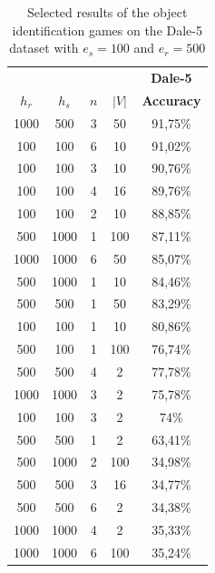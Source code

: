 \begin{table}[ht]
    \centering
    \begin{tabular}{cccc|c}
        \toprule
               &        &     &       & \multicolumn{1}{c}{\textbf{Dale-5}} \\  \cmidrule(lr){5-5}
        $h_r$  & $h_s$  & $n$ & $|V|$ & \textbf{Accuracy}                   \\\midrule
        {1000} & {500}  & {3} & {50}  & {91,75\%}                           \\
        {100}  & {100}  & {6} & {10}  & {91,02\%}                           \\
        {100}  & {100}  & {3} & {10}  & {90,76\%}                           \\
        {100}  & {100}  & {4} & {16}  & {89,76\%}                           \\
        {100}  & {100}  & {2} & {10}  & {88,85\%}                           \\
        {500}  & {1000} & {1} & {100} & {87,11\%}                           \\
        {1000} & {1000} & {6} & {50}  & {85,07\%}                           \\
        {500}  & {1000} & {1} & {10}  & {84,46\%}                           \\
        {500}  & {500}  & {1} & {50}  & {83,29\%}                           \\
        {100}  & {100}  & {1} & {10}  & {80,86\%}                           \\
        {500}  & {100}  & {1} & {100} & {76,74\%}                           \\
        {500}  & {500}  & {4} & {2}   & {77,78\%}                           \\
        {1000} & {1000} & {3} & {2}   & {75,78\%}                           \\
        {100}  & {100}  & {3} & {2}   & {74\%}                              \\
        {500}  & {500}  & {1} & {2}   & {63,41\%}                           \\
        {500}  & {1000} & {2} & {100} & {34,98\%}                           \\
        {500}  & {500}  & {3} & {16}  & {34,77\%}                           \\
        {500}  & {500}  & {6} & {2}   & {34,38\%}                           \\
        {1000} & {1000} & {4} & {2}   & {35,33\%}                           \\
        {1000} & {1000} & {6} & {100} & {35,24\%}                           \\
        \bottomrule
    \end{tabular}
    \caption{Selected results of the object identification games on the Dale-5 dataset with $e_s=100$ and $e_r=500$}
    \label{tab:results_discriminator_dale-5}
\end{table}

